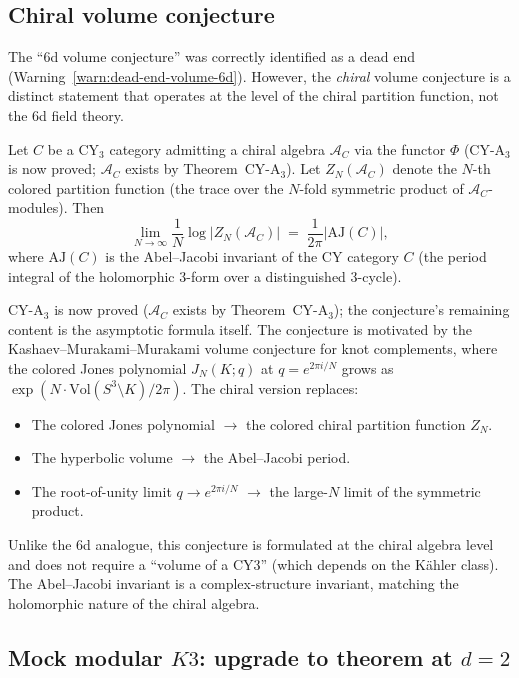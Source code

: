 \documentclass[11pt]{article}
\newcommand{\cA}{\mathcal{A}}
\begin{document}
\subsection{Chiral volume conjecture}
\label{subsec:chiral-volume-conjecture}

The ``6d volume conjecture'' was correctly identified as a dead end
(Warning~\ref{warn:dead-end-volume-6d}). However, the \emph{chiral}
volume conjecture is a distinct statement that operates at the level
of the chiral partition function, not the 6d field theory.

\begin{conjecture}
\label{conj:chiral-volume}
Let $C$ be a CY$_3$ category admitting a chiral algebra $\cA_C$
via the functor $\Phi$ (CY-A$_3$ is now proved; $\cA_C$ exists by Theorem~CY-A$_3$). Let $Z_N(\cA_C)$
denote the $N$-th colored partition function (the trace over the
$N$-fold symmetric product of $\cA_C$-modules). Then
\[
 \lim_{N \to \infty} \frac{1}{N} \log |Z_N(\cA_C)|
 \;=\; \frac{1}{2\pi} \bigl|\mathrm{AJ}(C)\bigr|,
\]
where $\mathrm{AJ}(C)$ is the Abel--Jacobi invariant of the
CY category $C$ (the period integral of the holomorphic
$3$-form over a distinguished $3$-cycle).
\end{conjecture}

\noindent CY-A$_3$ is now proved ($\cA_C$ exists by Theorem~CY-A$_3$); the conjecture's remaining content is the asymptotic formula itself.
The conjecture is motivated by the Kashaev--Murakami--Murakami volume
conjecture for knot complements, where the colored Jones polynomial
$J_N(K; q)$ at $q = e^{2\pi i/N}$ grows as $\exp(N \cdot
\mathrm{Vol}(S^3 \setminus K) / 2\pi)$. The chiral version replaces:
\begin{itemize}
 \item The colored Jones polynomial $\to$ the colored chiral
 partition function $Z_N$.
 \item The hyperbolic volume $\to$ the Abel--Jacobi period.
 \item The root-of-unity limit $q \to e^{2\pi i / N}$ $\to$ the
 large-$N$ limit of the symmetric product.
\end{itemize}
Unlike the 6d analogue, this conjecture is formulated at the chiral
algebra level and does not require a ``volume of a CY3'' (which
depends on the K\"ahler class). The Abel--Jacobi invariant is a
complex-structure invariant, matching the holomorphic nature
of the chiral algebra.


\subsection{Mock modular $K3$: upgrade to theorem at $d = 2$}
\label{subsec:mock-modular-k3-theorem}
\end{document}
